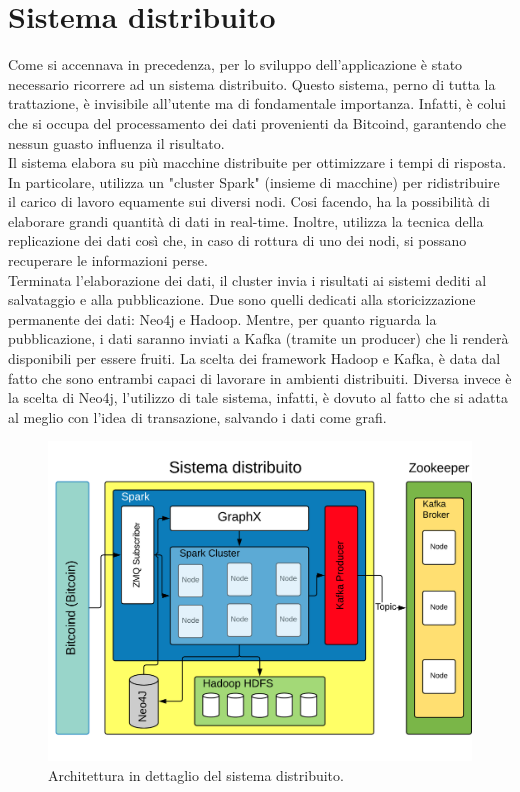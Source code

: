 \section{Sistema distribuito}
\label{sec:sistema distribuito}
Come si accennava in precedenza, per lo sviluppo dell'applicazione è stato necessario ricorrere ad un sistema distribuito. Questo sistema, perno di tutta la trattazione, è invisibile all'utente ma di fondamentale importanza. Infatti, è colui che si occupa del processamento dei dati provenienti da Bitcoind, garantendo che nessun guasto influenza il risultato.
\\Il sistema elabora su più macchine distribuite per ottimizzare i tempi di risposta. In particolare, utilizza un "cluster Spark" (insieme di macchine) per ridistribuire il carico di lavoro equamente sui diversi nodi. Cosi facendo, ha la possibilità di elaborare grandi quantità di dati in real-time. Inoltre, utilizza la tecnica della replicazione dei dati così che, in caso di rottura di uno dei nodi, si possano recuperare le informazioni perse.
\\Terminata l'elaborazione dei dati, il cluster invia i risultati ai sistemi dediti al salvataggio e alla pubblicazione. Due sono quelli dedicati alla storicizzazione permanente dei dati: Neo4j e Hadoop. Mentre, per quanto riguarda la pubblicazione, i dati saranno inviati a Kafka (tramite un producer) che li renderà disponibili per essere fruiti. La scelta dei framework Hadoop e Kafka, è data dal fatto che sono entrambi capaci di lavorare in ambienti distribuiti. Diversa invece è la scelta di Neo4j, l'utilizzo di tale sistema, infatti, è dovuto al fatto che si adatta al meglio con l'idea di transazione, salvando i dati come grafi.

\begin{figure}[H]
	\centering
	\includegraphics[width=\textwidth]{images/sistemaDistribuito.png}
	\caption{Architettura in dettaglio del sistema distribuito.}
	\label{fig:distribuitedSystemArchitetture}
\end{figure}